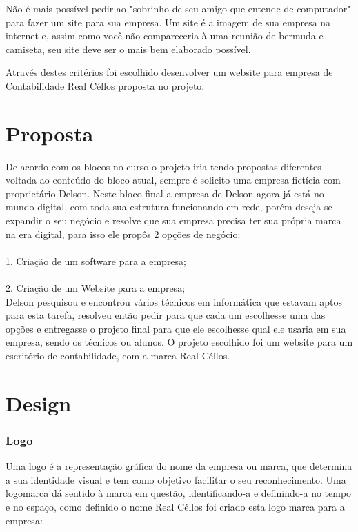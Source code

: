 \documentclass[
	12pt,				%
    oneside,			%
	a4paper,			%
	english,			%
	french,				%
	spanish,			%
	brazil,				%
	]{abntex2}
\begin{document}
Não é mais possível pedir ao "sobrinho de seu amigo que entende de computador" para fazer um site para sua empresa. Um site é a imagem de sua empresa na internet e, assim como você não compareceria à uma reunião de bermuda e camiseta, seu site deve ser o mais bem elaborado possível. 

Através destes critérios foi escolhido desenvolver um website para empresa de Contabilidade Real Céllos proposta no projeto. 

\chapter{Proposta}

De acordo com os blocos no curso o projeto iria tendo propostas diferentes voltada ao conteúdo do bloco atual, sempre é solicito uma empresa fictícia com proprietário Delson. Neste bloco final a empresa de Delson agora já está no mundo digital, com toda sua estrutura funcionando em rede, porém
deseja-se expandir o seu negócio e resolve que sua empresa precisa ter sua própria marca na
era digital, para isso ele propôs 2 opções de negócio:\\
\\1. Criação de um software para a empresa;\\
\\2. Criação de um Website para a empresa;\\

Delson pesquisou e encontrou vários técnicos em informática que estavam aptos para esta tarefa,
resolveu então pedir para que cada um escolhesse uma das opções e entregasse o projeto final para que
ele escolhesse qual ele usaria em sua empresa, sendo os técnicos ou alunos. O projeto escolhido foi um website para um escritório de contabilidade, com a marca Real Céllos.


\chapter{Design}

\subsection{Logo}

Uma logo é a representação gráfica do nome da empresa ou marca, que determina a sua identidade visual e tem como objetivo facilitar o seu reconhecimento. Uma logomarca dá sentido à marca em questão, identificando-a e definindo-a no tempo e no espaço, como definido o nome Real Céllos foi criado esta logo marca para a empresa:\\
\end{document}
